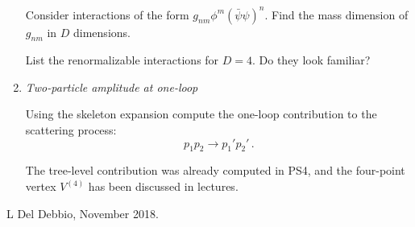 \documentclass[12pt,a4paper]{article}
\newcommand{\psibar}{\bar{\psi}}
\begin{document}
\begin{enumerate}
  Consider interactions of the form $g_{nm} \phi^m
  (\psibar\psi)^n$. Find the mass dimension of $g_{nm}$ in $D$
  dimensions.
  
  List the renormalizable interactions for $D=4$. Do they look
  familiar? 

  \bigskip

\item \emph{ Two-particle amplitude at one-loop}

  Using the skeleton expansion compute the one-loop contribution to
  the scattering process:
  \[
    p_1 p_2 \rightarrow p_1' p_2'\, .
  \]

  The tree-level contribution was already computed in PS4, and the
  four-point vertex $V^{(4)}$ has been discussed in lectures.
  
\end{enumerate}

\vfill
\hspace*{\fill}\tiny L Del Debbio, November 2018.
\end{document}
